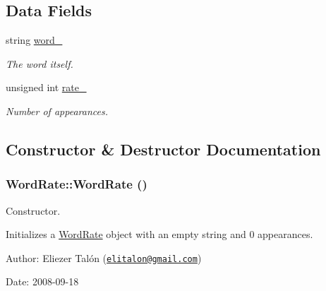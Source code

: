 \subsection*{Data Fields}
\begin{CompactItemize}
\item 
\hypertarget{struct_word_rate_5a6907590a6e95ff90c60df191622cce}{
string \hyperlink{struct_word_rate_5a6907590a6e95ff90c60df191622cce}{word\_\-}}
\label{struct_word_rate_5a6907590a6e95ff90c60df191622cce}

\begin{CompactList}\small\item\em The word itself. \item\end{CompactList}\item 
\hypertarget{struct_word_rate_23b0cc4d386139bb6ec66b2655d35d70}{
unsigned int \hyperlink{struct_word_rate_23b0cc4d386139bb6ec66b2655d35d70}{rate\_\-}}
\label{struct_word_rate_23b0cc4d386139bb6ec66b2655d35d70}

\begin{CompactList}\small\item\em Number of appearances. \item\end{CompactList}\end{CompactItemize}


\subsection{Constructor \& Destructor Documentation}
\hypertarget{struct_word_rate_c22aaa0c04769cce44ba08bf5e6eb655}{
\subsubsection[WordRate]{\setlength{\rightskip}{0pt plus 5cm}WordRate::WordRate ()}}
\label{struct_word_rate_c22aaa0c04769cce44ba08bf5e6eb655}


Constructor. 

Initializes a \hyperlink{struct_word_rate}{WordRate} object with an empty string and 0 appearances.

\begin{Desc}
\item[Author:]Eliezer Talón (\href{mailto:elitalon@gmail.com}{\tt elitalon@gmail.com}) \end{Desc}
\begin{Desc}
\item[Date:]2008-09-18 \end{Desc}


